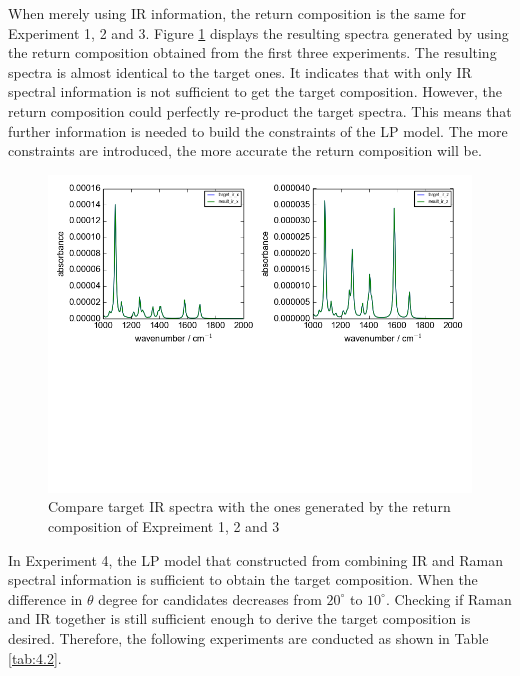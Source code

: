 When merely using IR information, the return composition is the same for Experiment 1, 2 and 3. Figure \ref{fig:4.1} displays the resulting spectra generated by using the return composition obtained from the first three experiments. The resulting spectra is almost identical to the target ones. It indicates that with only IR spectral information is not sufficient to get the target composition.  However, the return composition could perfectly re-product the target spectra. This means that further information is needed to build the constraints of the LP model. The more constraints are introduced, the more accurate the return composition will be. \\

\begin{figure}[!ht]
\centering
\includegraphics[scale=0.7]{Figures/ir_xz_result_plotting.png}
\caption{Compare target IR spectra with the ones generated by the return composition of Expreiment 1, 2 and 3}  \label{fig:4.1}
\end{figure}

In Experiment 4, the LP model that constructed from combining IR and Raman spectral information is sufficient to obtain the target composition. When the difference in $\theta$ degree for candidates decreases from $20^{\circ}$ to $10^{\circ}$. Checking if Raman and IR together is still sufficient enough to derive the target composition is desired. Therefore, the following experiments are conducted as shown in Table \ref{tab:4.2}. \\

